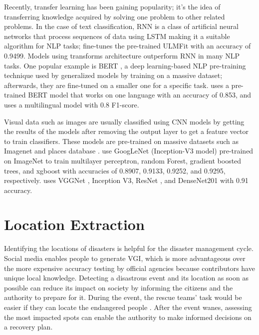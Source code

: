 Recently, transfer learning has been gaining popularity; it's the idea of transferring knowledge
acquired by solving one problem to other related problems. In the case of text classification,
\ac{RNN} is a class of artificial neural networks that process sequences of data using \ac{LSTM}
making it a suitable algorithm for \ac{NLP} tasks;
 fine-tunes the pre-trained \ac{ULMFit}
\cite{howardUniversalLanguageModel2018} with an accuracy of 0.9499. Models using transforms
architecture outperform \ac{RNN} in many \ac{NLP} tasks. One popular example is \ac{BERT}
\cite{devlinBERTPretrainingDeep2019}, a deep learning-based \ac{NLP} pre-training technique used by
generalized models by training on a massive dataset; afterwards, they are fine-tuned on a smaller
one for a specific task.  uses a pre-trained \ac{BERT} model
that works on one language with an accuracy of 0.853, and
 uses a multilingual model with 0.8 F1-score.

Visual data such as images are usually classified using \ac{CNN} models by getting the results of
the models after removing the output layer to get a feature vector to train classifiers. These
models are pre-trained on massive datasets such as Imagenet
\cite{krizhevskyImageNetClassificationDeep2017} and places database
\cite{zhouLearningDeepFeatures2014}.  use GoogLeNet
(Inception-V3 model) \cite{7780677} pre-trained on ImageNet to train multilayer perceptron, random
Forest, gradient boosted trees, and  xgboost with accuracies of 0.8907, 0.9133, 0.9252, and 0.9295,
respectively.  uses VGGNet
\cite{simonyanVeryDeepConvolutional2015}, Inception V3, ResNet \cite{heDeepResidualLearning2015},
and DenseNet201 \cite{huangDenselyConnectedConvolutional2018} with 0.91 accuracy.

\section{Location Extraction}
Identifying the locations of disasters is helpful for the disaster management cycle. Social media
enables people to generate \ac{VGI}, which is more advantageous over the more expensive accuracy
testing by official agencies because contributors have unique local knowledge.  Detecting a
disastrous event and its location as soon as possible can reduce its impact on society
\cite{debruijnGlobalDatabaseHistoric2019b} by informing the citizens and the authority to prepare
for it. During the event, the rescue teams' task would be easier if they can locate the endangered
people \cite{singhEventClassificationLocation2019}. After the event wanes, assessing the most
impacted spots can enable the authority to make informed decisions on a recovery plan.

